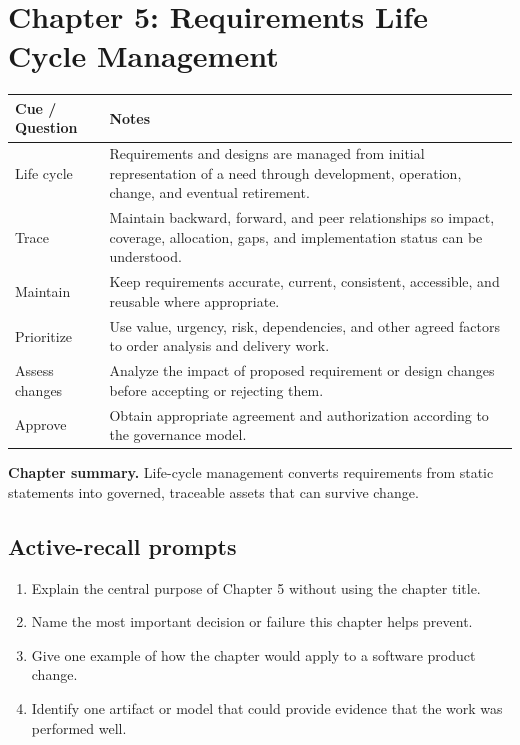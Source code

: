 \documentclass[11pt]{article}
\begin{document}
\section{Chapter 5: Requirements Life Cycle Management}
\begin{longtable}{L{0.26\textwidth} L{0.64\textwidth}}
\toprule
\textbf{Cue / Question} & \textbf{Notes}\\
\midrule
\endhead
Life cycle & Requirements and designs are managed from initial representation of a need through development, operation, change, and eventual retirement.\\
Trace & Maintain backward, forward, and peer relationships so impact, coverage, allocation, gaps, and implementation status can be understood.\\
Maintain & Keep requirements accurate, current, consistent, accessible, and reusable where appropriate.\\
Prioritize & Use value, urgency, risk, dependencies, and other agreed factors to order analysis and delivery work.\\
Assess changes & Analyze the impact of proposed requirement or design changes before accepting or rejecting them.\\
Approve & Obtain appropriate agreement and authorization according to the governance model.\\
\bottomrule
\end{longtable}
\begin{keybox}\textbf{Chapter summary.} Life-cycle management converts requirements from static statements into governed, traceable assets that can survive change.\end{keybox}
\subsection*{Active-recall prompts}
\begin{enumerate}
\item Explain the central purpose of Chapter 5 without using the chapter title.
\item Name the most important decision or failure this chapter helps prevent.
\item Give one example of how the chapter would apply to a software product change.
\item Identify one artifact or model that could provide evidence that the work was performed well.
\end{enumerate}
\end{document}
